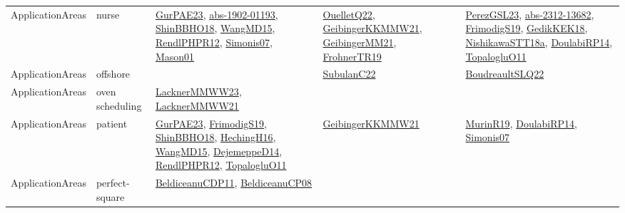 {\begin{longtable}{lp{3cm}>{\raggedright}p{6cm}>{\raggedright}p{6cm}p{8cm}}
ApplicationAreas & nurse & \href{articles/GurPAE23.pdf}{GurPAE23}\cite{GurPAE23}, \href{articles/abs-1902-01193.pdf}{abs-1902-01193}\cite{abs-1902-01193}, \href{articles/ShinBBHO18.pdf}{ShinBBHO18}\cite{ShinBBHO18}, \href{articles/WangMD15.pdf}{WangMD15}\cite{WangMD15}, \href{papers/RendlPHPR12.pdf}{RendlPHPR12}\cite{RendlPHPR12}, \href{articles/Simonis07.pdf}{Simonis07}\cite{Simonis07}, \href{articles/Mason01.pdf}{Mason01}\cite{Mason01} & \href{papers/OuelletQ22.pdf}{OuelletQ22}\cite{OuelletQ22}, \href{papers/GeibingerKKMMW21.pdf}{GeibingerKKMMW21}\cite{GeibingerKKMMW21}, \href{papers/GeibingerMM21.pdf}{GeibingerMM21}\cite{GeibingerMM21}, \href{papers/FrohnerTR19.pdf}{FrohnerTR19}\cite{FrohnerTR19} & \href{papers/PerezGSL23.pdf}{PerezGSL23}\cite{PerezGSL23}, \href{articles/abs-2312-13682.pdf}{abs-2312-13682}\cite{abs-2312-13682}, \href{papers/FrimodigS19.pdf}{FrimodigS19}\cite{FrimodigS19}, \href{articles/GedikKEK18.pdf}{GedikKEK18}\cite{GedikKEK18}, \href{papers/NishikawaSTT18a.pdf}{NishikawaSTT18a}\cite{NishikawaSTT18a}, \href{papers/DoulabiRP14.pdf}{DoulabiRP14}\cite{DoulabiRP14}, \href{articles/TopalogluO11.pdf}{TopalogluO11}\cite{TopalogluO11}\\
ApplicationAreas & offshore &  & \href{articles/SubulanC22.pdf}{SubulanC22}\cite{SubulanC22} & \href{papers/BoudreaultSLQ22.pdf}{BoudreaultSLQ22}\cite{BoudreaultSLQ22}\\
ApplicationAreas & oven scheduling & \href{articles/LacknerMMWW23.pdf}{LacknerMMWW23}\cite{LacknerMMWW23}, \href{papers/LacknerMMWW21.pdf}{LacknerMMWW21}\cite{LacknerMMWW21} &  & \\
ApplicationAreas & patient & \href{articles/GurPAE23.pdf}{GurPAE23}\cite{GurPAE23}, \href{papers/FrimodigS19.pdf}{FrimodigS19}\cite{FrimodigS19}, \href{articles/ShinBBHO18.pdf}{ShinBBHO18}\cite{ShinBBHO18}, \href{papers/HechingH16.pdf}{HechingH16}\cite{HechingH16}, \href{articles/WangMD15.pdf}{WangMD15}\cite{WangMD15}, \href{papers/DejemeppeD14.pdf}{DejemeppeD14}\cite{DejemeppeD14}, \href{papers/RendlPHPR12.pdf}{RendlPHPR12}\cite{RendlPHPR12}, \href{articles/TopalogluO11.pdf}{TopalogluO11}\cite{TopalogluO11} & \href{papers/GeibingerKKMMW21.pdf}{GeibingerKKMMW21}\cite{GeibingerKKMMW21} & \href{papers/MurinR19.pdf}{MurinR19}\cite{MurinR19}, \href{papers/DoulabiRP14.pdf}{DoulabiRP14}\cite{DoulabiRP14}, \href{articles/Simonis07.pdf}{Simonis07}\cite{Simonis07}\\
ApplicationAreas & perfect-square & \href{articles/BeldiceanuCDP11.pdf}{BeldiceanuCDP11}\cite{BeldiceanuCDP11}, \href{papers/BeldiceanuCP08.pdf}{BeldiceanuCP08}\cite{BeldiceanuCP08} &  & \\

\end{longtable}}
